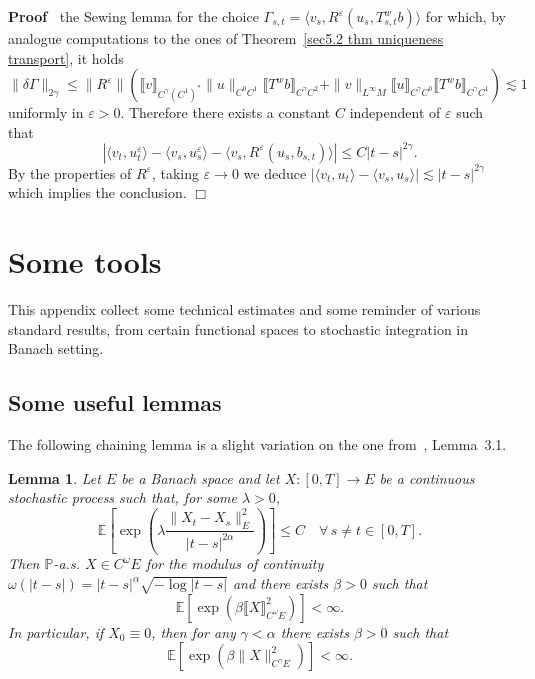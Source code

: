 \documentclass[10pt]{article}
\newenvironment{proof}{\noindent\textbf{Proof\ }}{\hspace*{\fill}$\Box$\medskip}
\newtheorem{lemma}{Lemma}
\begin{document}
\begin{proof}
  the Sewing lemma for the choice $\Gamma_{s, t} = \langle v_s,
  R^{\varepsilon} (u_s, T^w_{s, t} b) \rangle$ for which, by analogue
  computations to the ones of Theorem~\ref{sec5.2 thm uniqueness transport},
  it holds
  \[ \| \delta \Gamma \|_{2 \gamma} \leqslant \| R^{\varepsilon} \| 
     (\llbracket v \rrbracket_{C^{\gamma} (C^1)^{\ast}}  \| u \|_{C^0 C^1} 
     \llbracket T^w b \rrbracket_{C^{\gamma} C^2} + \| v \|_{L^{\infty} M} 
     \llbracket u \rrbracket_{C^{\gamma} C^0}  \llbracket T^w b
     \rrbracket_{C^{\gamma} C^1}) \lesssim 1 \]
  uniformly in $\varepsilon > 0$. Therefore there exists a constant $C$
  independent of $\varepsilon$ such that
  \[ | \langle v_t, u^{\varepsilon}_t \rangle - \langle v_s, u^{\varepsilon}_s
     \rangle - \langle v_s, R^{\varepsilon} (u_s, b_{s, t}) \rangle |
     \leqslant C | t - s |^{2 \gamma} . \]
  By the properties of $R^{\varepsilon}$, taking $\varepsilon \rightarrow 0$
  we deduce $| \langle v_t, u_t \rangle - \langle v_s, u_s \rangle | \lesssim
  | t - s |^{2 \gamma}$ which implies the conclusion.
\end{proof}

\appendix\section{Some tools}\label{appendix}

This appendix collect some technical estimates and some reminder of various
standard results, from certain functional spaces to stochastic integration in
Banach setting.

\subsection{Some useful lemmas}\label{appendixA1}

The following chaining lemma is a slight variation on the one
from~{\cite{catelliergubinelli}}, Lemma~3.1.

\begin{lemma}
  \label{appendixA1 chaining lemma}Let $E$ be a Banach space and let $X : [0,
  T] \rightarrow E$ be a continuous stochastic process such that, for some
  $\lambda > 0$,
  \begin{equation}
    \mathbb{E} \left[ \exp \left( \lambda \frac{\| X_t - X_s \|^2_E}{| t - s
    |^{2 \alpha}} \right) \right] \leqslant C \quad \forall \, s \neq t \in
    [0, T] .
  \end{equation}
  Then $\mathbb{P}$-a.s. $X \in C^{\omega} E$ for the modulus of continuity
  $\omega (| t - s |) = | t - s |^{\alpha} \sqrt{- \log | t - s |}$ and there
  exists $\beta > 0$ such that
  \[ \mathbb{E} [\exp (\beta \llbracket X \rrbracket^2_{C^{\omega} E})] <
     \infty . \]
  In particular, if $X_0 \equiv 0$, then for any $\gamma < \alpha$ there
  exists $\beta > 0$ such that
  \[ \mathbb{E} [\exp (\beta \| X \|^2_{C^{\gamma} E})] < \infty . \]
\end{lemma}
\end{document}
